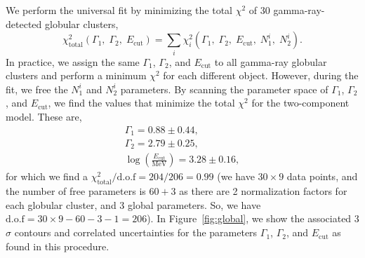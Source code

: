 \documentclass[doublespace,nopageskip]{VTthesis}
\begin{document}
We perform the universal fit by minimizing the total $\chi^2$ of 30 gamma-ray-detected globular clusters,
\begin{equation}
    \chi^2_\mathrm{total}(\Gamma_1,\;\Gamma_2,\;E_\mathrm{cut}) = \sum_i\chi_i^2(\Gamma_1,\;\Gamma_2,\;E_\mathrm{cut},\;N_1^i,\;N_2^i).
\end{equation}
In practice, we assign the same $\Gamma_1$, $\Gamma_2$, and $E_\mathrm{cut}$ to all gamma-ray globular clusters and perform a minimum $\chi^2$ for each different object. However, during the fit, we free the $N_1^i$ and $N_2^i$ parameters. By scanning the parameter space of $\Gamma_1$, $\Gamma_2$, and $E_\mathrm{cut}$, we find the values that minimize the total $\chi^2$ for the two-component model. These are, 
\begin{align}\nonumber
    \Gamma_1 = 0.88 \pm 0.44,\\\nonumber
    \Gamma_2 = 2.79 \pm 0.25,\\\nonumber
    \log\left(\frac{E_\mathrm{cut}}{\mathrm{MeV}}\right) = 3.28 \pm 0.16,
\end{align}
for which we find a $\chi^2_\mathrm{total} / \mathrm{d.o.f} = 204/206 = 0.99$ (we have $30\times 9$ data points, and the number of free parameters is $60+3$ as there are 2 normalization factors for each globular cluster, and 3 global parameters. So, we have $\mathrm{d.o.f}=30\times 9 - 60 - 3 -1 = 206$). In Figure~\ref{fig:global}, we show the associated 3$\sigma$ contours and correlated uncertainties for the parameters $\Gamma_1$, $\Gamma_2$, and $E_\mathrm{cut}$ as found in this procedure.
\end{document}
